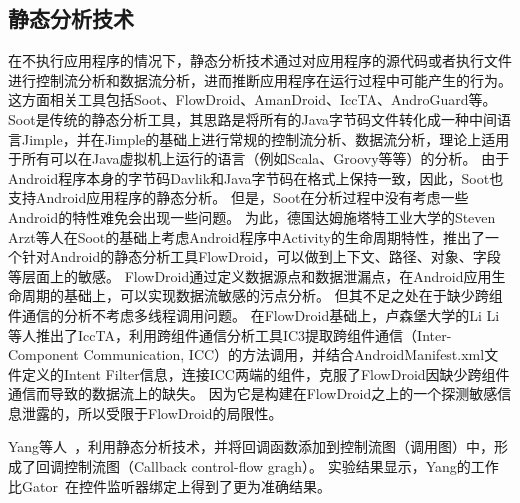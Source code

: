 \subsection{静态分析技术}
在不执行应用程序的情况下，静态分析技术通过对应用程序的源代码或者执行文件进行控制流分析和数据流分析，进而推断应用程序在运行过程中可能产生的行为。
这方面相关工具包括Soot\cite{vallee1999soot}、FlowDroid\cite{arzt2014flowdroid}、AmanDroid\cite{AmanDroid}、IccTA\cite{iccta}、AndroGuard\cite{androguard:online}等。
Soot\cite{vallee1999soot}是传统的静态分析工具，其思路是将所有的Java字节码文件转化成一种中间语言Jimple，并在Jimple的基础上进行常规的控制流分析、数据流分析，理论上适用于所有可以在Java虚拟机上运行的语言（例如Scala、Groovy等等）的分析。
由于Android程序本身的字节码Davlik和Java字节码在格式上保持一致，因此，Soot也支持Android应用程序的静态分析。
但是，Soot在分析过程中没有考虑一些Android的特性难免会出现一些问题。
为此，德国达姆施塔特工业大学的Steven Arzt等人在Soot的基础上考虑Android程序中Activity的生命周期特性，推出了一个针对Android的静态分析工具FlowDroid\cite{arzt2014flowdroid}，可以做到上下文、路径、对象、字段等层面上的敏感。
FlowDroid通过定义数据源点和数据泄漏点，在Android应用生命周期的基础上，可以实现数据流敏感的污点分析。
但其不足之处在于缺少跨组件通信的分析不考虑多线程调用问题。
在FlowDroid基础上，卢森堡大学的Li Li等人推出了IccTA\cite{iccta}，利用跨组件通信分析工具IC3提取跨组件通信（Inter-Component Communication, ICC）的方法调用，并结合AndroidManifest.xml文件定义的Intent Filter信息，连接ICC两端的组件，克服了FlowDroid因缺少跨组件通信而导致的数据流上的缺失。
因为它是构建在FlowDroid之上的一个探测敏感信息泄露的，所以受限于FlowDroid的局限性。

Yang等人~\cite{yang2015static}，利用静态分析技术，并将回调函数添加到控制流图（调用图）中，形成了回调控制流图（Callback control-flow gragh）。
实验结果显示，Yang的工作比Gator~\cite{rountev2014static}在控件监听器绑定上得到了更为准确结果。





